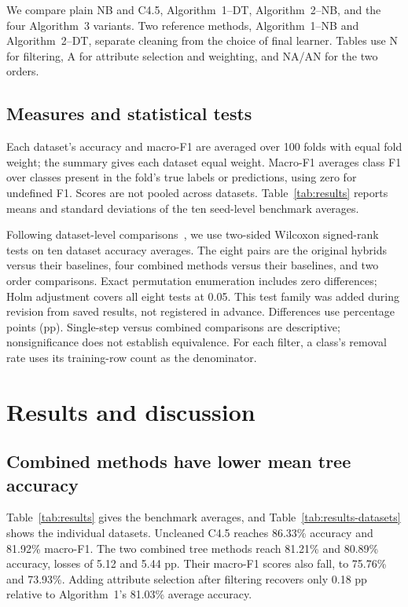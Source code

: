 \documentclass[conference]{IEEEtran}
\begin{document}
We compare plain NB and C4.5, Algorithm~1--DT, Algorithm~2--NB, and the four
Algorithm~3 variants. Two reference methods, Algorithm~1--NB and
Algorithm~2--DT, separate cleaning from the choice of final learner.
Tables use N for filtering, A for attribute selection and weighting, and
NA/AN for the two orders.

\subsection{Measures and statistical tests}
Each dataset's accuracy and macro-F1 are averaged over 100 folds with equal
fold weight; the summary gives each dataset equal weight. Macro-F1 averages
class F1 over classes present in the fold's true labels or predictions,
using zero for undefined F1. Scores are not pooled across datasets.
Table~\ref{tab:results} reports means and standard deviations of the ten
seed-level benchmark averages.

Following dataset-level comparisons~\cite{demsar2006statistical}, we use
two-sided Wilcoxon signed-rank tests on ten dataset accuracy averages.
The eight pairs are the original hybrids versus their baselines, four
combined methods versus their baselines, and two order comparisons.
Exact permutation enumeration includes zero differences; Holm adjustment
covers all eight tests at 0.05. This test family was added during revision
from saved results, not registered in advance. Differences use percentage
points (pp). Single-step versus combined comparisons are descriptive;
nonsignificance does not establish equivalence. For each filter, a class's
removal rate uses its training-row count as the denominator.

\section{Results and discussion}
\subsection{Combined methods have lower mean tree accuracy}
Table~\ref{tab:results} gives the benchmark averages, and
Table~\ref{tab:results-datasets} shows the individual datasets. Uncleaned
C4.5 reaches 86.33\% accuracy and 81.92\% macro-F1. The two combined tree
methods reach 81.21\% and 80.89\% accuracy, losses of 5.12 and 5.44 pp.
Their macro-F1 scores also fall, to 75.76\% and 73.93\%. Adding attribute
selection after filtering recovers only 0.18 pp relative to Algorithm~1's
81.03\% average accuracy.
\end{document}
